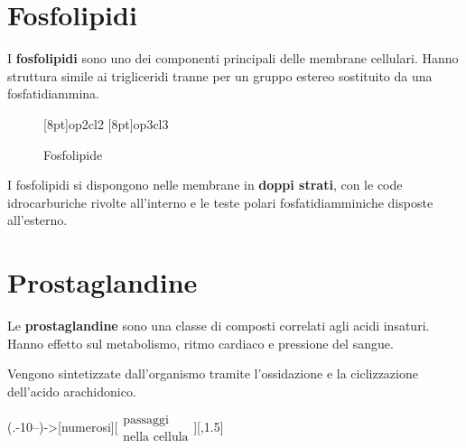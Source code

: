 \section{Fosfolipidi}\label{sec:fosfolipidi}
I \textbf{fosfolipidi} sono uno dei componenti principali delle membrane cellulari. Hanno struttura simile ai trigliceridi tranne per un gruppo estereo sostituito da una fosfatidiammina.
\begin{figure}[H]
	\centering
	\makepolymerdelims[delimiters=(),subscript=$\scriptstyle \!n$]{2pt}[8pt]{op2}{cl2}
	\makepolymerdelims[delimiters=(),subscript=$\scriptstyle \!n$]{2pt}[8pt]{op3}{cl3}
	\caption{Fosfolipide}
\end{figure}

I fosfolipidi si dispongono nelle membrane in \textbf{doppi strati}, con le code idrocarburiche rivolte all'interno e le teste polari fosfatidiamminiche disposte all'esterno.


\section{Prostaglandine}\label{sec:prostaglandine}
Le \textbf{prostaglandine} sono una classe di composti correlati agli acidi insaturi. Hanno effetto sul metabolismo, ritmo cardiaco e pressione del sangue.

Vengono sintetizzate dall'organismo tramite l'ossidazione e la ciclizzazione dell'acido arachidonico.
	{\scriptsize
		\begin{reaction}
			\arrow(.-10--){->[\scriptsize numerosi][$\substack{\text{passaggi}\\ \text{nella cellula}}$]}[,1.5]
		\end{reaction}
	}


